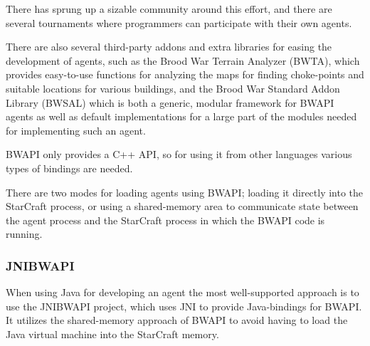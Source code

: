 There has sprung up a sizable community around this effort, and there are several tournaments where programmers can participate with their own agents.\cite{bwapi}\cite{sscait}

There are also several third-party addons and extra libraries for easing the development of agents, such as the Brood War Terrain Analyzer (BWTA), which provides easy-to-use functions for analyzing the maps for finding choke-points and suitable locations for various buildings\cite{bwta}, and the Brood War Standard Addon Library (BWSAL) which is both a generic, modular framework for BWAPI agents as well as default implementations for a large part of the modules needed for implementing such an agent.\cite{bwsal}

BWAPI only provides a C++ API, so for using it from other languages various types of bindings are needed.\cite{jnibwapi}

There are two modes for loading agents using BWAPI; loading it directly into the StarCraft process, or using a shared-memory area to communicate state between the agent process and the StarCraft process in which the BWAPI code is running.\cite{bwapi}

\subsubsection{JNIBWAPI}
When using Java for developing an agent the most well-supported approach is to use the JNIBWAPI project, which uses JNI to provide Java-bindings for BWAPI. It utilizes the shared-memory approach of BWAPI to avoid having to load the Java virtual machine into the StarCraft memory.
